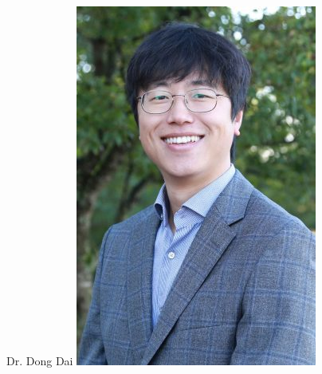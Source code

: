\documentclass[aspectratio=169]{beamer}
\begin{document}
\begin{frame}
\begin{columns}
    Dr. Dong Dai
    \includegraphics[width=.9\linewidth]{pics/Dai.png}
    
  \end{columns}
  
\end{frame}
\end{document}
